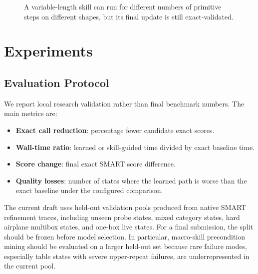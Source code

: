 \documentclass[10pt,twocolumn,letterpaper]{article}
\begin{document}
\begin{figure}[t]
\small
{}
\caption{A variable-length skill can run for different numbers of primitive
steps on different shapes, but its final update is still exact-validated.}
\label{fig:skill_algo}
\end{figure}

\section{Experiments}

\subsection{Evaluation Protocol}

We report local research validation rather than final benchmark numbers.  The
main metrics are:

\begin{itemize}
\item \textbf{Exact call reduction}: percentage fewer candidate exact scores.
\item \textbf{Wall-time ratio}: learned or skill-guided time divided by exact
baseline time.
\item \textbf{Score change}: final exact SMART score difference.
\item \textbf{Quality losses}: number of states where the learned path is worse
than the exact baseline under the configured comparison.
\end{itemize}

The current draft uses held-out validation pools produced from native SMART
refinement traces, including unseen probe states, mixed category states, hard
airplane multibox states, and one-box live states.  For a final submission, the
split should be frozen before model selection.  In particular, macro-skill
precondition mining should be evaluated on a larger held-out set because rare
failure modes, especially table states with severe upper-repeat failures, are
underrepresented in the current pool.
\end{document}
